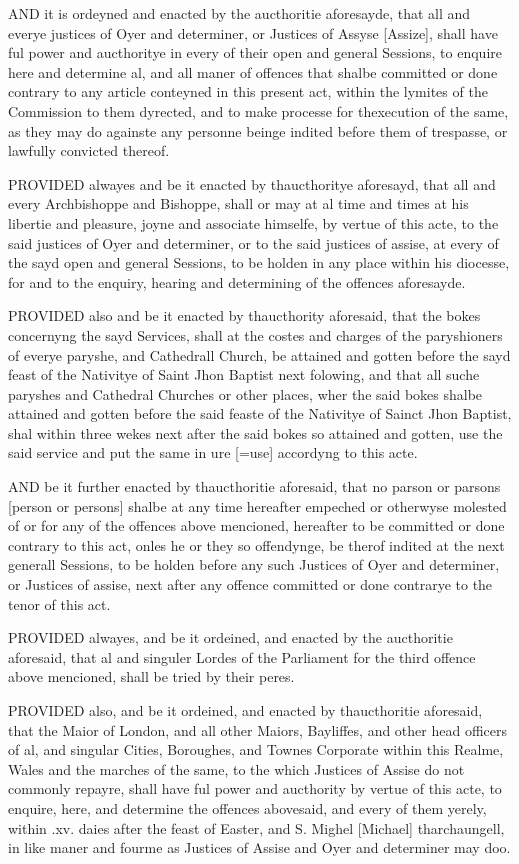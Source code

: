 AND it is ordeyned and enacted
by the aucthoritie aforesayde, that all and everye justices of Oyer
and determiner, or Justices of Assyse [Assize],
shall have ful power and aucthoritye in every of their open and general
Sessions, to enquire here and determine al, and all maner of offences
that shalbe committed or done contrary to any article conteyned in this
present act, within the lymites of the Commission to them dyrected,
and to make processe for thexecution of the same, as they may do againste
any personne beinge indited before them of trespasse, or lawfully convicted
thereof.

PROVIDED alwayes and be it
enacted by thaucthoritye aforesayd, that all and every Archbishoppe
and Bishoppe, shall or may at al time and times at his libertie and
pleasure, joyne and associate himselfe, by vertue of this acte, to the
said justices of Oyer and determiner, or to the said justices of assise,
at every of the sayd open and general Sessions, to be holden in any
place within his diocesse, for and to the enquiry, hearing and determining
of the offences aforesayde.

PROVIDED also and be it enacted
by thaucthority aforesaid, that the bokes concernyng the sayd Services,
shall at the costes and charges of the paryshioners of everye paryshe,
and Cathedrall Church, be attained and gotten before the sayd feast
of the Nativitye of Saint Jhon Baptist next folowing, and that all suche
paryshes and Cathedral Churches or other places, wher the said bokes
shalbe attained and gotten before the said feaste of the Nativitye of
Sainct Jhon Baptist, shal within three wekes next after the said bokes
so attained and gotten, use the said service and put the same in ure
[=use] accordyng to this acte.

AND be it further enacted
by thaucthoritie aforesaid, that no parson or parsons [person
or persons] shalbe at any time hereafter empeched or otherwyse
molested of or for any of the offences above mencioned, hereafter to
be committed or done contrary to this act, onles he or they so offendynge,
be therof indited at the next generall Sessions, to be holden before
any such Justices of Oyer and determiner, or Justices of assise, next
after any offence committed or done contrarye to the tenor of this act.

PROVIDED alwayes, and be it
ordeined, and enacted by the aucthoritie aforesaid, that al and singuler
Lordes of the Parliament for the third offence above mencioned, shall
be tried by their peres.

PROVIDED also, and be it ordeined,
and enacted by thaucthoritie aforesaid, that the Maior of London, and
all other Maiors, Bayliffes, and other head officers of al, and singular
Cities, Boroughes, and Townes Corporate within this Realme, Wales and
the marches of the same, to the which Justices of Assise do not commonly
repayre, shall have ful power and aucthority by vertue of this acte,
to enquire, here, and determine the offences abovesaid, and every of
them yerely, within .xv. daies after the feast of Easter, and S. Mighel
[Michael] tharchaungell, in like
maner and fourme as Justices of Assise and Oyer and determiner may doo.

